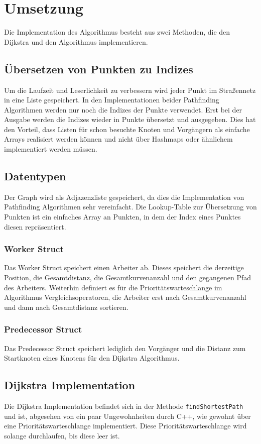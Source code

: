 \documentclass[a4paper,10pt,ngerman]{scrartcl}
\begin{document}
\section{Umsetzung}
Die Implementation des Algorithmus besteht aus zwei Methoden, die den Dijkstra und den Algorithmus implementieren.

\subsection{Übersetzen von Punkten zu Indizes}
Um die Laufzeit und Leserlichkeit zu verbessern wird jeder Punkt im Straßennetz in eine Liste gespeichert. In den Implementationen beider Pathfinding Algorithmen werden
nur noch die Indizes der Punkte verwendet. Erst bei der Ausgabe werden die Indizes wieder in Punkte übersetzt und ausgegeben. Dies hat den Vorteil, dass
Listen für schon besuchte Knoten und Vorgängern als einfache Arrays realisiert werden können und nicht über Hashmaps oder ähnlichem implementiert werden müssen.

\subsection{Datentypen}
Der Graph wird als Adjazenzliste gespeichert, da dies die Implementation von Pathfinding Algorithmen sehr vereinfacht. Die Lookup-Table zur Übersetzung von Punkten
ist ein einfaches Array an Punkten, in dem der Index eines Punktes diesen repräsentiert.

\subsubsection{Worker Struct}
Das Worker Struct speichert einen Arbeiter ab. Dieses speichert die derzeitige Position, die Gesamtdistanz, die Gesamtkurvenanzahl und den gegangenen Pfad des Arbeiters.
Weiterhin definiert es für die Prioritätswarteschlange im Algorithmus Vergleichsoperatoren, die Arbeiter erst nach Gesamtkurvenanzahl und dann nach Gesamtdistanz sortieren.

\subsubsection{Predecessor Struct}
Das Predecessor Struct speichert lediglich den Vorgänger und die Distanz zum Startknoten eines Knotens für den Dijkstra Algorithmus.

\subsection{Dijkstra Implementation}
Die Dijkstra Implementation befindet sich in der Methode \texttt{findShortestPath} und ist, abgesehen von ein paar Ungewohnheiten durch C++, wie gewohnt über
eine Prioritätswarteschlange implementiert. Diese Prioritätswarteschlange wird solange durchlaufen, bis diese leer ist.
\end{document}
